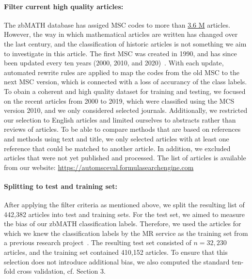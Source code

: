 \paragraph{Filter current high quality articles:}
The zbMATH database has assiged MSC codes to more than \href{https://zbmath.org/?q=cc\%3A*}{3.6 M} articles.
However, the way in which mathematical articles are written has changed over the last century, and the classification of historic articles is not something we aim to investigate in this article. The first MSC was created in 1990, and has since been updated every ten years (2000, 2010, and 2020)~\cite{MSC2010}.
With each update, automated rewrite rules are applied to map the codes from the old MSC to the next MSC version, which is connected with a loss of accurancy of the class labels.
To obain a coherent and high quality dataset for training and testing, we focused on the recent articles from 2000 to 2019, which were classified using the MCS version 2010, and we only considered selected journals.
Additionally, we restricted our selection to English articles and limited ourselves to abstracts rather than reviews of articles.
To be able to compare methods that are based on references and methods using text and title, we only selected articles with at least one reference that could be matched to another article.
In addition, we excluded articles that were not yet published and processed.
The list of articles is available from our website: \url{https://automsceval.formulasearchengine.com}
\paragraph{Splitting to test and training set:}
After applying the filter criteria as mentioned above, we split the resulting list of 442,382 articles into test and training sets.
For the test set, we aimed to measure the bias of our zbMATH classification labels.
Therefore, we used the articles for which we knew the classification labels by the MR service as the training set from a previous research project~\cite{Bannister2018}.
The resulting test set consisted of \(n = 32,230\) articles, and the training set contained 410,152 articles.
To ensure that this selection does not introduce additional bias, we also computed the standard ten-fold cross validation, cf. Section 3.
